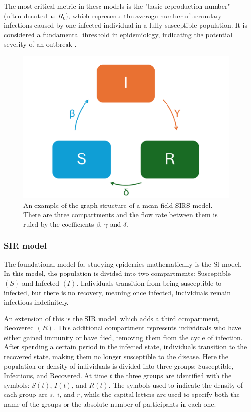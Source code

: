 The most critical metric in these models is the "basic reproduction number" (often denoted as $R_0$), which represents the average number of secondary infections caused by one infected individual in a fully susceptible population. It is considered a fundamental threshold in epidemiology, indicating the potential severity of an outbreak \cite{Hernandez_Vargas_2022}. 
\begin{figure}[]
	\centering
	\includegraphics[width=0.65\linewidth]{0_introduction/images_introduction/SIRS_figure_compartmental}
	\caption[SIRS example]{An example of the graph structure of a mean field SIRS model. There are three compartments and the flow rate between them is ruled by the coefficients $\beta$, $\gamma$ and $\delta$.}
	\label{fig:sirsfigurecompartmental}
\end{figure}


\subsubsection{SIR model}
\label{subsec:SIR}
The foundational model for studying epidemics mathematically is the SI model. In this model, the population is divided into two compartments: Susceptible $(S)$ and Infected $(I)$. Individuals transition from being susceptible to infected, but there is no recovery, meaning once infected, individuals remain infectious indefinitely.

An extension of this is the SIR model, which adds a third compartment, Recovered $(R)$. This additional compartment represents individuals who have either gained immunity or have died, removing them from the cycle of infection. After spending a certain period in the infected state, individuals transition to the recovered state, making them no longer susceptible to the disease.
Here the population or density of individuals is divided into three groups: Susceptible, Infectious, and Recovered. At time $t$ the three groups are identified with the symbols: $S(t)$, $I(t)$, and $R(t)$. 
The symbols used to indicate the density of each group are $s$, $i$, and $r$, while the capital letters are used to specify both the name of the groups or the absolute number of participants in each one. 


